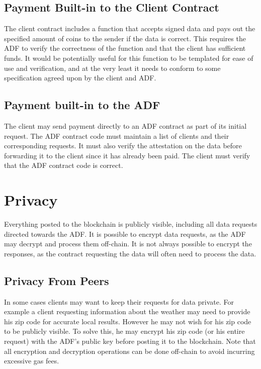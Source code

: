 \subsection{Payment Built-in to the Client Contract}
    The client contract includes a function that accepts signed data and pays out the specified amount of coins to the sender if the data is correct.  This requires the ADF to verify the correctness of the function and that the client has sufficient funds.  It would be potentially useful for this function to be templated for ease of use and verification, and at the very least it needs to conform to some specification agreed upon by the client and ADF. 
    
\subsection{Payment built-in to the ADF}
    The client may send payment directly to an ADF contract as part of its initial request.  The ADF contract code must maintain a list of clients and their corresponding requests.  It must also verify the attestation on the data before forwarding it to the client since it has already been paid.  The client must verify that the ADF contract code is correct.
    
    
\section{Privacy}
Everything posted to the blockchain is publicly visible, including all data requests directed towards the ADF.  It is possible to encrypt data requests, as the ADF may decrypt and process them off-chain.  It is not always possible to encrypt the responses, as the contract requesting the data will often need to process the data.

\subsection{Privacy From Peers}
    In some cases clients may want to keep their requests for data private.  For example a client requesting information about the weather may need to provide his zip code for accurate local results.  However he may not wish for his zip code to be publicly visible.  To solve this, he may encrypt his zip code (or his entire request) with the ADF's public key before posting it to the blockchain.  Note that all encryption and decryption operations can be done off-chain to avoid incurring excessive gas fees.\\

